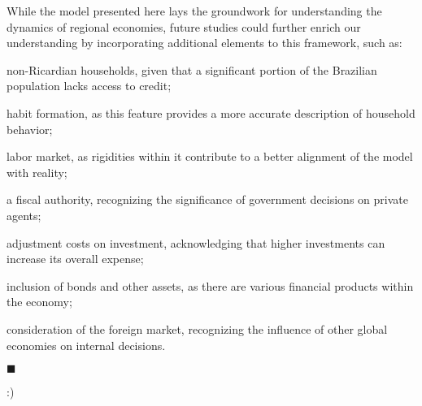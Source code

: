 \documentclass[../thesis.tex]{subfiles}
\begin{document}
While the model presented here lays the groundwork for understanding the dynamics of regional economies, future studies could further enrich our understanding by incorporating additional elements to this framework, such as: %
\begin{enumerate*}[label=(\arabic*)]
	\item non-Ricardian households, given that a significant portion of the Brazilian population lacks access to credit; 
	\item habit formation, as this feature provides a more accurate description of household behavior;
	\item labor market, as rigidities within it contribute to a better alignment of the model with reality;
	\item a fiscal authority, recognizing the significance of government decisions on private agents;
	\item adjustment costs on investment, acknowledging that higher investments can increase its overall expense;
	\item inclusion of bonds and other assets, as there are various financial products within the economy;
	\item consideration of the foreign market, recognizing the influence of other global economies on internal decisions.
\end{enumerate*} \hfill $\blacksquare$

:)

\begin{comment}
	The model presented here contemplates some features that characterize a New Keynesian model. For future studies, it should be considered to implement more elements, such as 
	\begin{enumerate*}[label=(\arabic*)]
		\item non-Ricardiand households, as a considerable part of Brasilian population has no access to credit;
		\item habit formation, as this feature describes better the household behavior;
		\item labor market, as its rigidities contribute for a better adherence of the model to reality;
		\item a fiscal authority, as the influence of government decisions are important to the private agents;
		\item adjustment costs on investment, considering that the higher the investment, the more expensive it becomes;
		\item bonds and other assets, as there are different financial products to choose from in the economy;
		\item foreign market, as the other economies in the world can influence the internal decisions.
	\end{enumerate*}
\end{comment}




 
\end{document}
